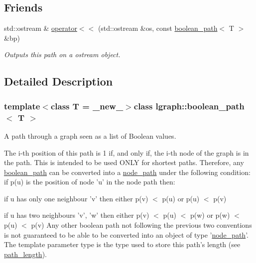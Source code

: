 \subsection*{Friends}
\begin{DoxyCompactItemize}
\item 
std\-::ostream \& \hyperlink{classlgraph_1_1boolean__path_a3f1b01270c5ffdd0f7ce524dc1e29725}{operator$<$$<$} (std\-::ostream \&os, const \hyperlink{classlgraph_1_1boolean__path}{boolean\-\_\-path}$<$ T $>$ \&bp)
\begin{DoxyCompactList}\small\item\em Outputs this path on a {\itshape ostream} object. \end{DoxyCompactList}\end{DoxyCompactItemize}


\subsection{Detailed Description}
\subsubsection*{template$<$class T = \-\_\-new\-\_\-$>$class lgraph\-::boolean\-\_\-path$<$ T $>$}

A path through a graph seen as a list of Boolean values. 

The i-\/th position of this path is 1 if, and only if, the i-\/th node of the graph is in the path. This is intended to be used O\-N\-L\-Y for shortest paths. Therefore, any \hyperlink{classlgraph_1_1boolean__path}{boolean\-\_\-path} can be converted into a \hyperlink{classlgraph_1_1node__path}{node\-\_\-path} under the following condition\-: if p(u) is the position of node 'u' in the node path then\-:
\begin{DoxyItemize}
\item if u has only one neighbour 'v' then either p(v) $<$ p(u) or p(u) $<$ p(v)
\item if u has two neighbours 'v', 'w' then either p(v) $<$ p(u) $<$ p(w) or p(w) $<$ p(u) $<$ p(v) Any other boolean path not following the previous two conventions is not guaranteed to be able to be converted into an object of type '\hyperlink{classlgraph_1_1node__path}{node\-\_\-path}'. The template parameter type is the type used to store this path's length (see \hyperlink{classlgraph_1_1boolean__path_ab298ac156fd7d73e21769fd30b2c5ad1}{path\-\_\-length}).
\end{DoxyItemize}


